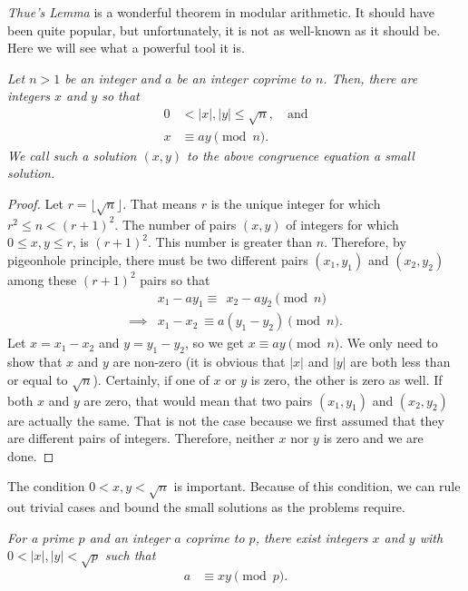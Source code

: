 \documentclass{subfile}
\begin{document}
\textit{Thue's Lemma} is a wonderful theorem in modular arithmetic. It should have been quite popular, but unfortunately, it is not as well-known as it should be. Here we will see what a powerful tool it is.

\begin{theorem}\label{thm:thue}\slshape
	Let $n>1$ be an integer and $a$ be an integer coprime to $n$. Then, there are integers $x$ and $y$ so that 
	\begin{align*}
		0 &< |x|, |y| \leq \sqrt n, \quad \text{and}\\
		x&\equiv ay\pmod n.
	\end{align*}
	We call such a solution $(x,y)$ to the above congruence equation a \textit{small solution}.
\end{theorem}

\begin{proof}
	Let $r=\lfloor\sqrt{n}\rfloor$. That means $r$ is the unique integer for which $r^2\leq n<(r+1)^2$. The number of pairs $(x,y)$ of integers for which $0\leq x,y\leq r$, is $(r+1)^2$. This number is greater than $n$. Therefore, by pigeonhole principle, there must be two different pairs $(x_1,y_1)$ and $(x_2,y_2)$ among these $(r+1)^2$ pairs so that 
	\begin{align*}
		& x_1-ay_1 \equiv \ \ x_2-ay_2 \pmod n\\
		\implies & x_1-x_2 \ \equiv a(y_1-y_2) \pmod n.
	\end{align*}
	Let $x=x_1-x_2$ and $y=y_1-y_2$, so we get $x\equiv ay\pmod n$. We only need to show that $x$ and $y$ are non-zero (it is obvious that $|x|$ and $|y|$ are both less than or equal to $\sqrt n$). Certainly, if one of $x$ or $y$ is zero, the other is zero as well. If both $x$ and $y$ are zero, that would mean that two pairs $(x_1,y_1)$ and $(x_2,y_2)$ are actually the same. That is not the case because we first assumed that they are different pairs of integers. Therefore, neither $x$ nor $y$ is zero and we are done.
\end{proof}
	
	\begin{note}
		The condition $0<x,y<\sqrt{n}$ is important. Because of this condition, we can rule out trivial cases and bound the small solutions as the problems require.
	\end{note}
	
	\begin{corollary}\slshape
		For a prime $p$ and an integer $a$ coprime to $p$, there exist integers $x$ and $y$ with $0<|x|,|y|<\sqrt{p}$ such that
		\begin{align*}
			a & \equiv xy\pmod p.
		\end{align*}
	\end{corollary}
	
\end{document}
